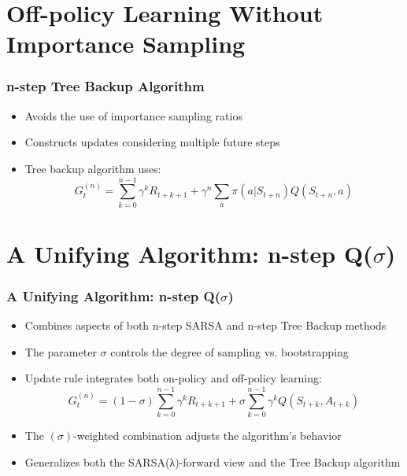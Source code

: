 \documentclass{beamer}
\begin{document}
    \section{Off-policy Learning Without Importance Sampling}
    \begin{frame}
        \frametitle{n-step Tree Backup Algorithm}
        \begin{itemize}
            \item Avoids the use of importance sampling ratios
            \item Constructs updates considering multiple future steps
            \item Tree backup algorithm uses:
            $$
            G_t^{(n)} = \sum_{k=0}^{n-1} \gamma^k R_{t+k+1} + \gamma^n \sum_{a} \pi(a|S_{t+n}) Q(S_{t+n}, a)
            $$
        \end{itemize}
    \end{frame}


    \section{A Unifying Algorithm: n-step Q($\sigma$)}
    \begin{frame}
        \frametitle{A Unifying Algorithm: n-step Q($\sigma$)}
        \begin{itemize}
            \item Combines aspects of both n-step SARSA and n-step Tree Backup methods
            \item The parameter \(\sigma\) controls the degree of sampling vs. bootstrapping
            \item Update rule integrates both on-policy and off-policy learning:
            $$
            G_t^{(n)} = (1 - \sigma) \sum_{k=0}^{n-1} \gamma^k R_{t+k+1} + \sigma \sum_{k=0}^{n-1} \gamma^k Q(S_{t+k}, A_{t+k})
            $$
            \item The $(\sigma)$-weighted combination adjusts the algorithm's behavior
            \item Generalizes both the SARSA(λ)-forward view and the Tree Backup algorithm
        \end{itemize}
    \end{frame}
\end{document}
